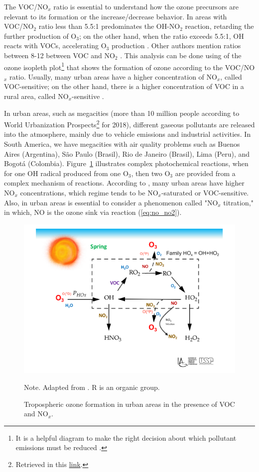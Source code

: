 The VOC/NO$_x$ ratio is essential to understand how the ozone precursors are relevant to its formation or the increase/decrease behavior.
In areas with VOC/NO$_2$ ratio less than 5.5:1 predominates the OH-NO$_2$ reaction, retarding the further production of O$_3$; on the other hand, when the ratio exceeds 5.5:1, OH reacts with VOCs, accelerating O$_3$ production \citep{Seinfeld2016}. Other authors mention ratios between 8-12 between VOC and NO$_2$ \citep[for instant, ratio of 11 in the MASP, according to][]{Orlando2010}.
This analysis can be done using of the ozone isopleth plot\footnote{It is a helpful diagram to make the right decision about which pollutant emissions must be reduced \citep{Seinfeld2016}.} that shows the formation of ozone according to the VOC/NO$_x$ ratio.
Usually, many urban areas have a higher concentration of NO$_x$, called VOC-sensitive; on the other hand, there is a higher concentration of VOC in a rural area, called NO$_x$-sensitive \citep{Von2015}.

In urban areas, such as megacities (more than 10 million people according to World Urbanization Prospects\footnote{Retrieved in this \href{https://population.un.org/wup/Publications/Files/WUP2018-Report.pdf}{link}.} for 2018), different gaseous pollutants are released into the atmosphere, mainly due to vehicle emissions and industrial activities.
In South America, we have megacities with air quality problems such as Buenos Aires (Argentina), São Paulo (Brasil), Rio de Janeiro (Brasil), Lima (Peru), and Bogotá (Colombia). 
Figure~\ref{fig:o3_urban} illustrates complex photochemical reactions, when for one OH radical produced from one O$_3$, then two O$_3$ are provided from a complex mechanism of reactions.
According to \citet{Von2015}, many urban areas have higher NO$_x$ concentrations, which regime tends to be NO$_x$-saturated or VOC-sensitive.
Also, in urban areas is essential to consider a phenomenon called "NO$_x$ titration," in which, NO is the ozone sink via reaction (\ref{eq:no_no2}).

\begin{figure}
	\centering
    \includegraphics[width=.8\textwidth]{fig/o3_urban.pdf}
  	\caption{Tropospheric ozone formation in urban areas in the presence of VOC and NO$_x$.} {\scriptsize Note. Adapted from \citet{Jacob1999}. R is an organic group.}
  \label{fig:o3_urban}
\end{figure}

